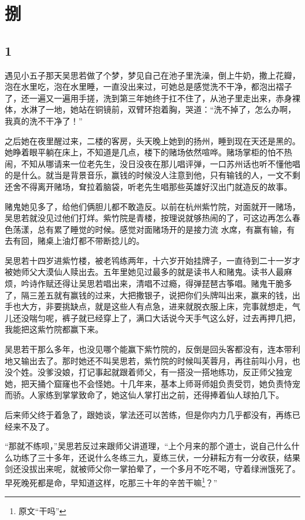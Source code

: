 \section{捌}

{\centering\subsection{1}}

遇见小五子那天吴思若做了个梦，梦见自己在池子里洗澡，倒上牛奶，撒上花瓣，泡在水里吃，泡在水里睡，一直没出来过，可她总是感觉洗不干净，都泡出褶子了，还一遍又一遍用手搓，洗到第三年她终于扛不住了，从池子里走出来，赤身裸体，水淋了一地，她站在铜镜前，双臂环抱着胸，哭道：“洗不掉了，怎么办啊，我真的洗不干净了！”

之后她在夜里醒过来，二楼的客房，头天晚上她到的扬州，睡到现在天还是黑的。她睁着眼平躺在床上，不知道是几点，楼下的赌场依然喧哗。赌场掌柜的怕不热闹，不知从哪请来一位老先生，没日没夜在那儿唱评弹，一口苏州话也听不懂他唱的是什么。就当是背景音乐，赢钱的时候没人注意到他，只有输钱的人，一文不剩还舍不得离开赌场，耷拉着脑袋，听老先生唱那些英雄好汉出门就造反的故事。

赌鬼她见多了，给他们俩胆儿都不敢造反。以前在杭州紫竹院，对面就开一赌场，吴思若就没见过他们打烊。紫竹院是青楼，按理说就够热闹的了，可这边再怎么春色荡漾，总有累了睡觉的时候。感觉对面赌场开的是接力流
水席，有赢有输，有去有回，赌桌上油灯都不带断捻儿的。

吴思若十四岁进紫竹楼，被老鸨练两年，十六岁开始挂牌子，一直待到二十一岁才被她师父大漠仙人赎出去。五年里她见过最多的就是读书人和赌鬼。读书人最麻烦，吟诗作赋还得让吴思若唱出来，清唱不过瘾，得弹琵琶古筝唱。赌鬼干脆多了，隔三差五就有赢钱的过来，大把撒银子，说把你们头牌叫出来，赢来的钱，出手也大方，非要挑缺点，就是这些人有点急，进来就脱衣服上床，完事就想走，气儿还没喘匀呢，裤子就已经穿上了，满口大话说今天手气这么好，过去再押几把，我能把这紫竹院都赢下来。

吴思若干那么多年，也没见哪个能赢下紫竹院的，反倒是回头客都没有，连本带利地又输出去了。那时她还不叫吴思若，紫竹院的时候叫芙蓉月，再往前叫小月，也没个姓。没爹没娘，打记事起就跟着师父，有一搭没一搭地练功，反正师父独宠她，把天捅个窟窿也不会怪她。十几年来，基本上师哥师姐负责受罚，她负责恃宠而骄。人家练到掌掌致命了，她这仙人掌打出之前，还得捧着仙人球拍几下。

后来师父终于着急了，跟她谈，掌法还可以苦练，但是你内力几乎都没有，再练已经来不及了。

“那就不练呗，”吴思若反过来跟师父讲道理，“上个月来的那个道士，说自己什么什么功练了三十多年，还说什么冬练三九，夏练三伏，一分耕耘方有一分收获，结果剑还没拔出来呢，就被师父你一掌拍晕了，一个多月不吃不喝，守着绿洲饿死了。早死晚死都是命，早知道这样，吃那三十年的辛苦干嘛\footnote{原文“干吗”}？”

